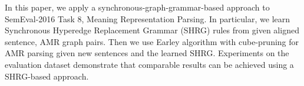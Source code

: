 In this paper, we apply a synchronous-graph-grammar-based approach to SemEval-2016 Task 8, Meaning Representation Parsing. In particular, we learn Synchronous Hyperedge Replacement Grammar (SHRG) rules from given aligned sentence, AMR graph pairs. Then we use Earley algorithm with cube-pruning for AMR parsing given new sentences and the learned SHRG. Experiments on the evaluation dataset demonstrate that comparable results can be achieved using a SHRG-based approach.
